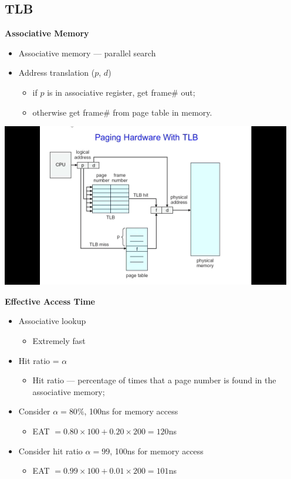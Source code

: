 \documentclass[11pt,a4paper]{article}
\begin{document}
\subsection{TLB}

\textbf{Associative Memory}
\begin{itemize}
    \item Associative memory --- parallel search
    \item Address translation ($p$, $d$)
        \begin{itemize}
            \item if $p$ is in associative register, get frame\# out;
            \item otherwise get frame\# from page table in memory.
        \end{itemize}
\end{itemize}

\includegraphics[height=270]{paging-hardware-with-tlb.jpg}

\textbf{Effective Access Time}
\begin{itemize}
    \item Associative lookup
        \begin{itemize}
            \item Extremely fast
        \end{itemize}
    \item Hit ratio = $\alpha$
        \begin{itemize}
            \item Hit ratio --- percentage of times that a page number is found in the
                associative memory;
        \end{itemize}
        \item Consider $\alpha = 80\%$, 100ns for memory access
            \begin{itemize}
                \item EAT $ = 0.80 \times 100 + 0.20 \times 200 = 120$ns
            \end{itemize}
        \item Consider hit ratio $\alpha = 99$, 100ns for memory access
            \begin{itemize}
                \item EAT $ = 0.99 \times 100 + 0.01 \times 200 = 101$ns
            \end{itemize}
\end{itemize}
\end{document}
